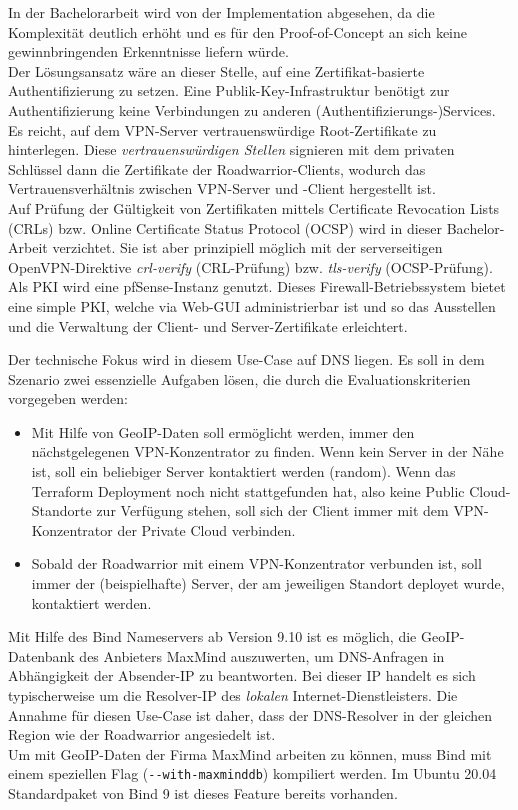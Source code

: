 In der Bachelorarbeit wird von der Implementation abgesehen, da die Komplexität deutlich erhöht und es für den Proof-of-Concept an sich keine gewinnbringenden Erkenntnisse liefern würde.\\
Der Lösungsansatz wäre an dieser Stelle, auf eine Zertifikat-basierte Authentifizierung zu setzen. Eine Publik-Key-Infrastruktur benötigt zur Authentifizierung keine Verbindungen zu anderen (Authentifizierungs-)Services. Es reicht, auf dem VPN-Server vertrauenswürdige Root-Zertifikate zu hinterlegen. Diese \textit{vertrauenswürdigen Stellen} signieren mit dem privaten Schlüssel dann die Zertifikate der Roadwarrior-Clients, wodurch das Vertrauensverhältnis zwischen VPN-Server und -Client hergestellt ist.\\ 
Auf Prüfung der Gültigkeit von Zertifikaten mittels Certificate Revocation Lists (CRLs) bzw. Online Certificate Status Protocol (OCSP) wird in dieser Bachelor-Arbeit verzichtet. Sie ist aber prinzipiell möglich mit der serverseitigen OpenVPN-Direktive \textit{crl-verify} (CRL-Prüfung) bzw. \textit{tls-verify} (OCSP-Prüfung).\cite[S.116, S.325-327]{Keijser2011}\\
Als PKI wird eine pfSense-Instanz genutzt. Dieses Firewall-Betriebssystem bietet eine simple PKI, welche via Web-GUI administrierbar ist und so das Ausstellen und die Verwaltung der Client- und Server-Zertifikate erleichtert.\cite[S.376-383]{Netgate2020}

Der technische Fokus wird in diesem Use-Case auf DNS liegen. Es soll in dem Szenario zwei essenzielle Aufgaben lösen, die durch die Evaluationskriterien vorgegeben werden:
\begin{itemize}
\item Mit Hilfe von GeoIP-Daten soll ermöglicht werden, immer den nächstgelegenen VPN-Konzentrator zu finden. Wenn kein Server in der Nähe ist, soll ein beliebiger Server kontaktiert werden (random)\cite{bindrrset2020}. Wenn das Terraform Deployment noch nicht stattgefunden hat, also keine Public Cloud-Standorte zur Verfügung stehen, soll sich der Client immer mit dem VPN-Konzentrator der Private Cloud verbinden.
\item Sobald der Roadwarrior mit einem VPN-Konzentrator verbunden ist, soll immer der (beispielhafte) Server, der am jeweiligen Standort deployet wurde, kontaktiert werden.
\end{itemize}

Mit Hilfe des Bind Nameservers ab Version 9.10 ist es möglich, die GeoIP-Datenbank des Anbieters MaxMind auszuwerten, um DNS-Anfragen in Abhängigkeit der Absender-IP zu beantworten\cite{bindgeoip2020}. Bei dieser IP handelt es sich typischerweise um die Resolver-IP des \textit{lokalen} Internet-Dienstleisters. Die Annahme für diesen Use-Case ist daher, dass der DNS-Resolver in der gleichen Region wie der Roadwarrior angesiedelt ist.\\
Um mit GeoIP-Daten der Firma MaxMind arbeiten zu können, muss Bind mit einem speziellen Flag (\texttt{-{}-with-maxminddb}) kompiliert werden. Im Ubuntu 20.04 Standardpaket von Bind 9 ist dieses Feature bereits vorhanden.

